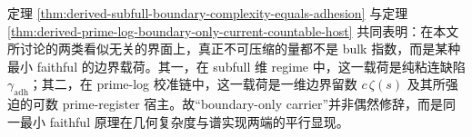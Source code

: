 \begin{remark}\label{rem:derived-boundary-only-faithful-carrier}
定理 \ref{thm:derived-subfull-boundary-complexity-equals-adhesion}
与定理 \ref{thm:derived-prime-log-boundary-only-current-countable-host}
共同表明：在本文所讨论的两类看似无关的界面上，真正不可压缩的量都不是 bulk 指数，而是某种最小 faithful 的边界载荷。其一，在 subfull 维 regime 中，这一载荷是纯粘连缺陷 \(\gamma_{\mathrm{adh}}\)；其二，在 prime-log 校准链中，这一载荷是一维边界留数 \(c\,\zeta(s)\) 及其所强迫的可数 prime-register 宿主。故“boundary-only carrier”并非偶然修辞，而是同一最小 faithful 原理在几何复杂度与谱实现两端的平行显现。
\end{remark}

\endinput
